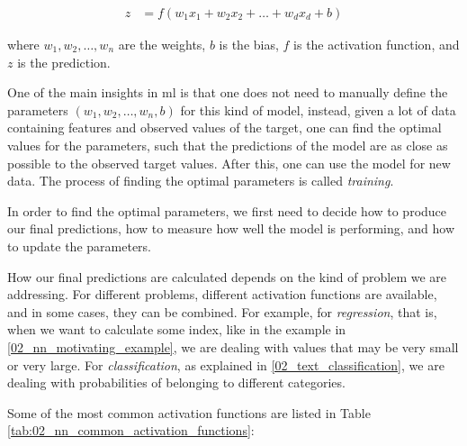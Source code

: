 \begin{align*}
    z &= f(w_1 x_1 + w_2 x_2 + \ldots + w_d x_d + b)
\end{align*}

where $w_1, w_2,\ldots,w_n$ are the weights, $b$ is the bias, $f$ is the activation function, and $z$ is the prediction.

One of the main insights in \gls{ml} is that one does not need to manually define the parameters $(w_1, w_2,\ldots,w_n,b)$ for this kind of model, instead, given a lot of data containing features and observed values of the target, one can find the optimal values for the parameters, such that the predictions of the model are as close as possible to the observed target values. After this, one can use the model for new data. The process of finding the optimal parameters is called \emph{training}.

In order to find the optimal parameters, we first need to decide how to produce our final predictions, how to measure how well the model is performing, and how to update the parameters.


\label{02_nn_activation_functions}

How our final predictions are calculated depends on the kind of problem we are addressing. For different problems, different activation functions are available, and in some cases, they can be combined. For example, for \emph{regression}, that is, when we want to calculate some index, like in the example in \headerName{} \ref{02_nn_motivating_example}, we are dealing with values that may be very small or very large. For \emph{classification}, as explained in \headerName{} \ref{02_text_classification}, we are dealing with probabilities of belonging to different categories.

Some of the most common activation functions are listed in Table \ref{tab:02_nn_common_activation_functions}: 



